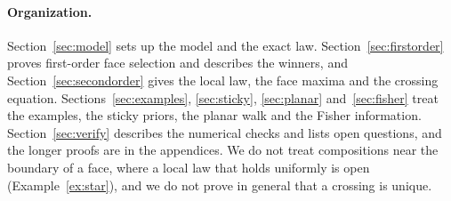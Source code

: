 \paragraph{Organization.}
Section~\ref{sec:model} sets up the model and the exact law.
Section~\ref{sec:firstorder} proves first-order face selection and
describes the winners, and Section~\ref{sec:secondorder} gives the local
law, the face maxima and the crossing equation.
Sections~\ref{sec:examples}, \ref{sec:sticky}, \ref{sec:planar}
and~\ref{sec:fisher} treat the examples, the sticky priors, the planar walk
and the Fisher information. Section~\ref{sec:verify} describes the
numerical checks and lists open questions, and the longer proofs are in the
appendices. We do not treat compositions near the boundary of a face,
where a local law that holds uniformly is open (Example~\ref{ex:star}), and
we do not prove in general that a crossing is unique.
